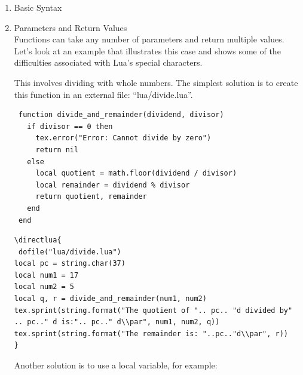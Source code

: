  \begin{enumerate}[label=(\alph*)]
  \item Basic Syntax

\begin{tkzexample}[latex=.4\textwidth]
\end{tkzexample}

\item Parameters and Return Values\\

Functions can take any number of parameters and return multiple values. Let's look at an example that illustrates this case and shows some of the difficulties associated with Lua's special characters.

This involves dividing with whole numbers. The simplest solution
is to create this function in an external file: “lua/divide.lua”.

\begin{mybox}
\begin{verbatim}
 function divide_and_remainder(dividend, divisor)
   if divisor == 0 then
     tex.error("Error: Cannot divide by zero")
     return nil
   else
     local quotient = math.floor(dividend / divisor)
     local remainder = dividend % divisor
     return quotient, remainder
   end
 end
\end{verbatim}
\end{mybox}

\begin{verbatim}
\directlua{
 dofile("lua/divide.lua")
local pc = string.char(37)
local num1 = 17
local num2 = 5
local q, r = divide_and_remainder(num1, num2)
tex.sprint(string.format("The quotient of ".. pc.. "d divided by"
.. pc.." d is:".. pc.." d\\par", num1, num2, q))
tex.sprint(string.format("The remainder is: "..pc.."d\\par", r))
}
\end{verbatim}


Another solution is to use a local variable, for example:


\end{enumerate}
